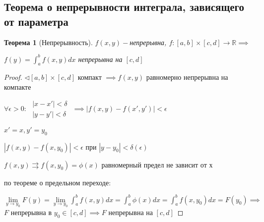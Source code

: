 \documentclass[a4paper]{article}
\newtheorem{theorem}{Теорема}[section]
\theoremstyle{definition}
\theoremstyle{remark}
\begin{document}
    \subsection{	Теорема о непрерывности интеграла, зависящего от параметра}
    \begin{theorem}[Непрерывность]

        $f(x,y) - $непрерывна, $f: [a,b]\times [c,d]\rightarrow \mathbb{R} \implies$
   
        $f(y) = \int_{a}^b f(x,y)dx $ непрерывна на $[c,d]$
   \end{theorem}
   \begin{proof}
        $\triangleleft [a,b]\times [c,d]$ компакт $\implies f(x,y)$ равномерно непрерывна на компакте
   
   $\forall \epsilon>0:$
   $
        \begin{array}{l}
             |x - x'|< \delta\\
             |y - y'|<\delta
        \end{array}
        $
        $\implies |f(x,y) - f(x', y')|<\epsilon$
   
        $x' = x, y' = y_0$
   
        $|f(x,y) - f(x,y_0)|<\epsilon$ при $|y - y_0|< \delta(\epsilon)$
   
        $f(x,y) \rightrightarrows f(x, y_0) = \phi(x)$ равномерный предел не зависит от х 
   
        по теореме о предельном переходе:
        
        $\lim\limits_{y\to y_0} F(y) = \lim\limits_{y\to y_0} \int_{a}^b f(x,y)dx = \int_{a}^b \phi(x) dx = \int_{a}^b f(x,y_0)dx  = F(y_0)\implies$
        $F$ непрерывна в $y_0 \in [c,d]\implies F$ непрерывна на $[c,d] $
   \end{proof}
\end{document}
